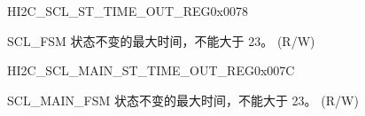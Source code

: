 \begin{register}{H}{I2C\_SCL\_ST\_TIME\_OUT\_REG}{0x{}0078}\label{regdesc:I2CSCLSTTIMEOUTREG}
%
%
\regnewline%
\begin{regdesc}\begin{reglist}
\label{fielddesc:I2CSCLSTTOI2C}\item [I2C\_SCL\_ST\_TO\_I2C] SCL\_FSM 状态不变的最大时间，不能大于 23。 (R/W)
\end{reglist}\end{regdesc}
\end{register}


\begin{register}{H}{I2C\_SCL\_MAIN\_ST\_TIME\_OUT\_REG}{0x{}007C}\label{regdesc:I2CSCLMAINSTTIMEOUTREG}
%
%
\regnewline%
\begin{regdesc}\begin{reglist}
\label{fielddesc:I2CSCLMAINSTTOI2C}\item [I2C\_SCL\_MAIN\_ST\_TO\_I2C] SCL\_MAIN\_FSM 状态不变的最大时间，不能大于 23。 (R/W)
\end{reglist}\end{regdesc}
\end{register}


